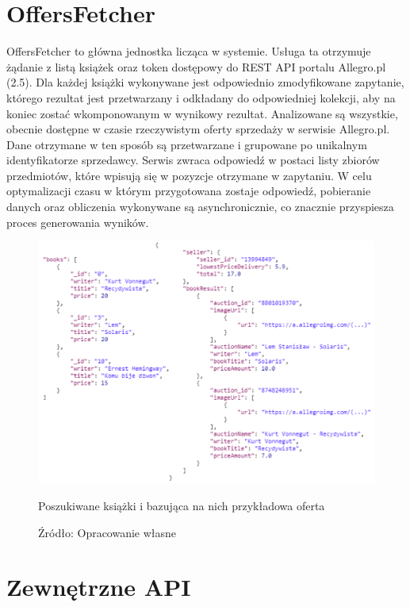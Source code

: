 \section{OffersFetcher}
OffersFetcher to główna jednostka licząca w systemie. Usługa ta otrzymuje żądanie z listą książek oraz token dostępowy do REST API portalu Allegro.pl (2.5).
Dla każdej książki wykonywane jest odpowiednio zmodyfikowane zapytanie, którego rezultat jest przetwarzany i odkładany do odpowiedniej kolekcji, aby na koniec zostać wkomponowanym w wynikowy rezultat. Analizowane są wszystkie, obecnie dostępne w czasie rzeczywistym oferty sprzedaży w serwisie Allegro.pl. Dane otrzymane w ten sposób są przetwarzane i grupowane po unikalnym identyfikatorze sprzedawcy. Serwis zwraca odpowiedź w postaci listy zbiorów przedmiotów, które wpisują się w pozyzcje otrzymane w zapytaniu. W celu optymalizacji czasu w którym przygotowana zostaje odpowiedź, pobieranie danych oraz obliczenia wykonywane są asynchronicznie, co znacznie przyspiesza proces generowania wyników.
\begin{figure}[H]
	\centering
	\includegraphics[width=\linewidth]{booksToOffers.pdf}
	\caption{\centering Poszukiwane książki i bazująca na nich przykładowa oferta}
	\caption*{\centering Źródło: {Opracowanie własne}}
\end{figure}

\section{Zewnętrzne API}

